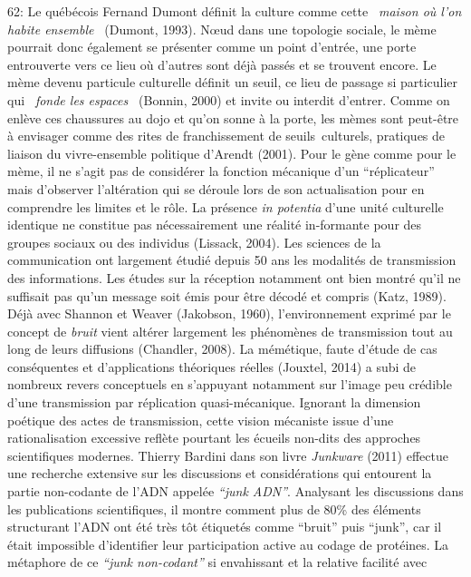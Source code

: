 62: Le qu\'eb\'ecois Fernand Dumont d\'efinit la culture comme cette \textit{{\guillemotleft}~maison o\`u l{\textquoteright}on habite ensemble~{\guillemotright} }(Dumont, 1993). N{\oe}ud dans une topologie sociale, le m\`eme pourrait donc \'egalement se pr\'esenter comme un point d{\textquoteright}entr\'ee, une porte entrouverte vers ce lieu o\`u d{\textquoteright}autres sont d\'ej\`a pass\'es et se trouvent encore. Le m\`eme devenu particule culturelle d\'efinit un seuil, ce lieu de passage si particulier qui \textit{{\guillemotleft}~fonde les espaces~{\guillemotright}} (Bonnin, 2000) et invite ou interdit d{\textquoteright}entrer. Comme on enl\`eve ces chaussures au dojo et qu{\textquoteright}on sonne \`a la porte, les m\`emes sont peut-\^etre \`a envisager comme des rites de franchissement de seuils~culturels, pratiques de liaison du vivre-ensemble politique d{\textquoteright}Arendt (2001). Pour le g\`ene comme pour le m\`eme, il ne s{\textquoteright}agit pas de consid\'erer la fonction m\'ecanique d{\textquoteright}un {\textquotedblleft}r\'eplicateur{\textquotedblright} mais d{\textquoteright}observer l{\textquoteright}alt\'eration qui se d\'eroule lors de son actualisation pour en comprendre les limites et le r\^ole. La pr\'esence \textit{in potentia }d{\textquoteright}une unit\'e culturelle identique ne constitue pas n\'ecessairement une r\'ealit\'e in-formante pour des groupes sociaux ou des individus (Lissack, 2004). Les sciences de la communication ont largement \'etudi\'e depuis 50 ans les modalit\'es de transmission des informations. Les \'etudes sur la r\'eception notamment ont bien montr\'e qu{\textquoteright}il ne suffisait pas qu{\textquoteright}un message soit \'emis pour \^etre d\'ecod\'e et compris (Katz, 1989). D\'ej\`a avec Shannon et Weaver (Jakobson, 1960), l{\textquoteright}environnement exprim\'e par le concept de\textit{ bruit }vient alt\'erer largement les ph\'enom\`enes de transmission tout au long de leurs diffusions (Chandler, 2008). La m\'em\'etique, faute d{\textquoteright}\'etude de cas cons\'equentes et d{\textquoteright}applications th\'eoriques r\'eelles (Jouxtel, 2014) a subi de nombreux revers conceptuels en s{\textquoteright}appuyant notamment sur l{\textquoteright}image peu cr\'edible d{\textquoteright}une transmission par r\'eplication quasi-m\'ecanique. Ignorant la dimension po\'etique des actes de transmission, cette vision m\'ecaniste issue d{\textquoteright}une rationalisation excessive refl\`ete pourtant les \'ecueils non-dits des approches scientifiques modernes. Thierry Bardini dans son livre \textit{Junkware }(2011) effectue une recherche extensive sur les discussions et consid\'erations qui entourent la partie non-codante de l{\textquoteright}ADN appel\'ee \textit{{\textquotedblleft}junk ADN{\textquotedblright}}. Analysant les discussions dans les publications scientifiques, il montre comment plus de 80\% des \'el\'ements structurant l{\textquoteright}ADN ont \'et\'e tr\`es t\^ot \'etiquet\'es comme {\textquotedblleft}bruit{\textquotedblright} puis {\textquotedblleft}junk{\textquotedblright}, car il \'etait impossible d{\textquoteright}identifier leur participation active au codage de prot\'eines. La m\'etaphore de ce \textit{{\textquotedblleft}junk non-codant{\textquotedblright} }si envahissant et la relative facilit\'e avec 